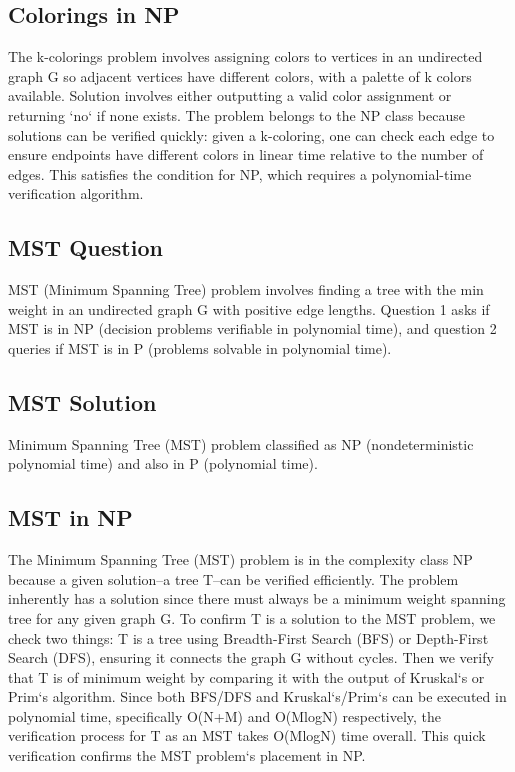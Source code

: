 \subsection*{Colorings in NP}
The k-colorings problem involves assigning colors to vertices in an undirected graph G so adjacent vertices have different colors, with a palette of k colors available.
Solution involves either outputting a valid color assignment or returning `no` if none exists.
The problem belongs to the NP class because solutions can be verified quickly: given a k-coloring, one can check each edge to ensure endpoints have different colors in linear time relative to the number of edges.
This satisfies the condition for NP, which requires a polynomial-time verification algorithm.

\subsection*{MST Question}
MST (Minimum Spanning Tree) problem involves finding a tree with the min weight in an undirected graph G with positive edge lengths.
Question 1 asks if MST is in NP (decision problems verifiable in polynomial time), and question 2 queries if MST is in P (problems solvable in polynomial time).

\subsection*{MST Solution}
Minimum Spanning Tree (MST) problem classified as NP (nondeterministic polynomial time) and also in P (polynomial time).

\subsection*{MST in NP}
The Minimum Spanning Tree (MST) problem is in the complexity class NP because a given solution--a tree T--can be verified efficiently.
The problem inherently has a solution since there must always be a minimum weight spanning tree for any given graph G\@.
To confirm T is a solution to the MST problem, we check two things: T is a tree using Breadth-First Search (BFS) or Depth-First Search (DFS), ensuring it connects the graph G without cycles.
Then we verify that T is of minimum weight by comparing it with the output of Kruskal`s or Prim`s algorithm.
Since both BFS/DFS and Kruskal`s/Prim`s can be executed in polynomial time, specifically O(N+M) and O(MlogN) respectively, the verification process for T as an MST takes O(MlogN) time overall.
This quick verification confirms the MST problem`s placement in NP\@.

